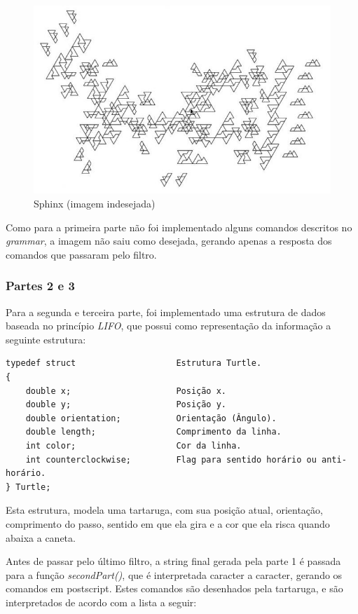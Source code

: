 \documentclass[a4paper,12pt]{article}%
\begin{document}
\begin{figure}[ht!]
\centering
\includegraphics[width=120mm]{sphinx.jpg}
\caption{Sphinx (imagem indesejada)}
\label{fig:Sphinx} 
\end{figure}

Como para a primeira parte não foi implementado alguns comandos descritos no \emph{grammar}, a imagem não saiu como desejada, gerando 
apenas a resposta dos comandos que passaram pelo filtro.


\subsubsection{Partes 2 e 3}

\hspace{1.5em}Para a segunda e terceira parte, foi implementado uma estrutura de dados baseada no princípio \emph{LIFO}, que possui como
representação da informação a seguinte estrutura:
\newpage
\begin{verbatim}
typedef struct                    Estrutura Turtle. 
{
    double x;                     Posição x. 
    double y;                     Posição y. 
    double orientation;           Orientação (Ângulo). 
    double length;                Comprimento da linha. 
    int color;                    Cor da linha. 
    int counterclockwise;         Flag para sentido horário ou anti-horário. 
} Turtle;
\end{verbatim}

Esta estrutura, modela uma tartaruga, com sua posição atual, orientação, comprimento do passo, sentido em que ela gira e a cor que 
ela risca quando abaixa a caneta.

Antes de passar pelo último filtro, a string final gerada pela parte 1 é passada para a função \emph{secondPart()}, que é
interpretada caracter a caracter, gerando os comandos em postscript. Estes comandos são desenhados pela tartaruga, e são interpretados
de acordo com a lista a seguir:
\end{document}
